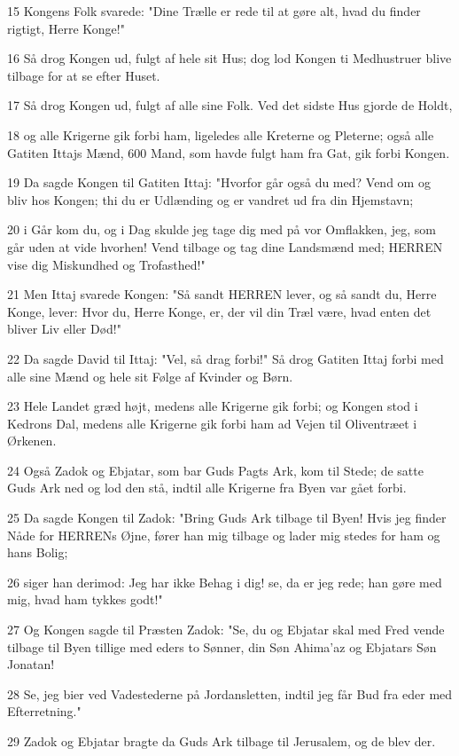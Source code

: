 \par 15 Kongens Folk svarede: "Dine Trælle er rede til at gøre alt, hvad du finder rigtigt, Herre Konge!"
\par 16 Så drog Kongen ud, fulgt af hele sit Hus; dog lod Kongen ti Medhustruer blive tilbage for at se efter Huset.
\par 17 Så drog Kongen ud, fulgt af alle sine Folk. Ved det sidste Hus gjorde de Holdt,
\par 18 og alle Krigerne gik forbi ham, ligeledes alle Kreterne og Pleterne; også alle Gatiten Ittajs Mænd, 600 Mand, som havde fulgt ham fra Gat, gik forbi Kongen.
\par 19 Da sagde Kongen til Gatiten Ittaj: "Hvorfor går også du med? Vend om og bliv hos Kongen; thi du er Udlænding og er vandret ud fra din Hjemstavn;
\par 20 i Går kom du, og i Dag skulde jeg tage dig med på vor Omflakken, jeg, som går uden at vide hvorhen! Vend tilbage og tag dine Landsmænd med; HERREN vise dig Miskundhed og Trofasthed!"
\par 21 Men Ittaj svarede Kongen: "Så sandt HERREN lever, og så sandt du, Herre Konge, lever: Hvor du, Herre Konge, er, der vil din Træl være, hvad enten det bliver Liv eller Død!"
\par 22 Da sagde David til Ittaj: "Vel, så drag forbi!" Så drog Gatiten Ittaj forbi med alle sine Mænd og hele sit Følge af Kvinder og Børn.
\par 23 Hele Landet græd højt, medens alle Krigerne gik forbi; og Kongen stod i Kedrons Dal, medens alle Krigerne gik forbi ham ad Vejen til Oliventræet i Ørkenen.
\par 24 Også Zadok og Ebjatar, som bar Guds Pagts Ark, kom til Stede; de satte Guds Ark ned og lod den stå, indtil alle Krigerne fra Byen var gået forbi.
\par 25 Da sagde Kongen til Zadok: "Bring Guds Ark tilbage til Byen! Hvis jeg finder Nåde for HERRENs Øjne, fører han mig tilbage og lader mig stedes for ham og hans Bolig;
\par 26 siger han derimod: Jeg har ikke Behag i dig! se, da er jeg rede; han gøre med mig, hvad ham tykkes godt!"
\par 27 Og Kongen sagde til Præsten Zadok: "Se, du og Ebjatar skal med Fred vende tilbage til Byen tillige med eders to Sønner, din Søn Ahima'az og Ebjatars Søn Jonatan!
\par 28 Se, jeg bier ved Vadestederne på Jordansletten, indtil jeg får Bud fra eder med Efterretning."
\par 29 Zadok og Ebjatar bragte da Guds Ark tilbage til Jerusalem, og de blev der.
